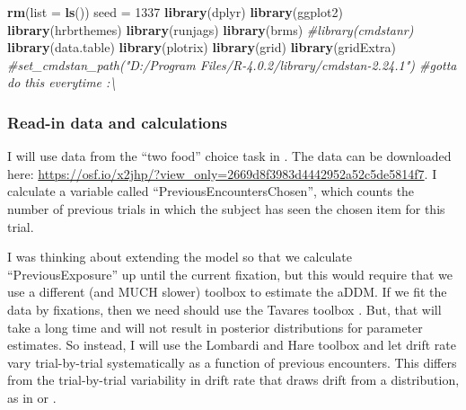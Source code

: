 \documentclass[
]{book}
\newenvironment{Shaded}{\begin{snugshade}}{\end{snugshade}}
\newcommand{\AttributeTok}[1]{\textcolor[rgb]{0.13,0.29,0.53}{#1}}
\newcommand{\CommentTok}[1]{\textcolor[rgb]{0.56,0.35,0.01}{\textit{#1}}}
\newcommand{\DecValTok}[1]{\textcolor[rgb]{0.00,0.00,0.81}{#1}}
\newcommand{\FunctionTok}[1]{\textcolor[rgb]{0.13,0.29,0.53}{\textbf{#1}}}
\newcommand{\NormalTok}[1]{#1}
\newcommand{\OtherTok}[1]{\textcolor[rgb]{0.56,0.35,0.01}{#1}}
\begin{document}
\begin{Shaded}
\begin{Highlighting}[]
\FunctionTok{rm}\NormalTok{(}\AttributeTok{list =} \FunctionTok{ls}\NormalTok{())}
\NormalTok{seed }\OtherTok{=} \DecValTok{1337}
\FunctionTok{library}\NormalTok{(dplyr)}
\FunctionTok{library}\NormalTok{(ggplot2)}
\FunctionTok{library}\NormalTok{(hrbrthemes)}
\FunctionTok{library}\NormalTok{(runjags)}
\FunctionTok{library}\NormalTok{(brms)}
\CommentTok{\#library(cmdstanr)}
\FunctionTok{library}\NormalTok{(data.table)}
\FunctionTok{library}\NormalTok{(plotrix)}
\FunctionTok{library}\NormalTok{(grid)}
\FunctionTok{library}\NormalTok{(gridExtra)}
\CommentTok{\#set\_cmdstan\_path("D:/Program Files/R{-}4.0.2/library/cmdstan{-}2.24.1") \#gotta do this everytime :\textbackslash{}}
\end{Highlighting}
\end{Shaded}

\hypertarget{read-in-data-and-calculations}{%
\subsubsection{Read-in data and calculations}\label{read-in-data-and-calculations}}

I will use data from the ``two food'' choice task in \citep{smith2018}. The data can be downloaded here: \url{https://osf.io/x2jhp/?view_only=2669d8f3983d4442952a52c5de5814f7}. I calculate a variable called ``PreviousEncountersChosen'', which counts the number of previous trials in which the subject has seen the chosen item for this trial.

I was thinking about extending the model so that we calculate ``PreviousExposure'' up until the current fixation, but this would require that we use a different (and MUCH slower) toolbox to estimate the aDDM. If we fit the data by fixations, then we need should use the Tavares toolbox \citep{tavares2017}. But, that will take a long time and will not result in posterior distributions for parameter estimates. So instead, I will use the Lombardi and Hare toolbox \citep{lombardi2021} and let drift rate vary trial-by-trial systematically as a function of previous encounters. This differs from the trial-by-trial variability in drift rate that draws drift from a distribution, as in \citep{lombardi2021} or \citep{eum2022}.
\end{document}
